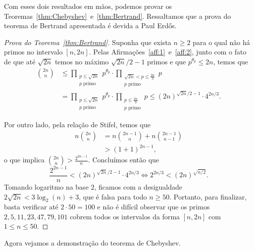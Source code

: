 \documentclass{hipatia}
\begin{document}
Com esses dois resultados em mãos, podemos provar os Teoremas~\ref{thm:Chebyshev}~e~\ref{thm:Bertrand}. Ressaltamos que a prova do teorema de Bertrand apresentada é devida a Paul Erd\H{o}s.

\begin{proof}[Prova do Teorema~\ref{thm:Bertrand}]
Suponha que exista $n \ge 2$ para o qual não há primos no intervalo $[n,2n]$. Pelas Afirmações~\ref{aff:1}~e~\ref{aff:2}, junto com o fato de que até $\sqrt{2n}$ temos no máximo $\sqrt{2n}/2 - 1$ primos e que $p^{\theta_p} \le 2n$, temos que
\begin{align*}
\binom{2n}{n} &\le \prod_{\substack{p \le \sqrt{2n}\\p\text{ primo}}} p^{\theta_p} \cdot \prod_{\substack{\sqrt{2n}<p\le\frac{2n}{3}\\p\text{ primo}}}p \\ &=\prod_{\substack{p \le \sqrt{2n}\\p\text{ primo}}} p^{\theta_p} \cdot \prod_{\substack{p\le\frac{2n}{3}\\p\text{ primo}}}p\le(2n)^{\sqrt{2n}/2-1}\cdot4^{2n/3}.
\end{align*}

Por outro lado, pela relação de Stifel, temos que
\begin{align*}
    n\binom{2n}{n}&=n\binom{2n-1}{n}+n\binom{2n-1}{n-1} \\
    &>(1+1)^{2n-1},    
\end{align*}
o que implica $\binom{2n}{n} > \frac{2^{2n-1}}{n}$. Concluímos então que
\[\frac{2^{2n-1}}{n}<(2n)^{\sqrt{2n}/2-1}\cdot4^{2n/3} \iff 2^{2n/3} < (2n)^{\sqrt{n/2}}.\]
Tomando logaritmo na base $2$, ficamos com a desigualdade $2\sqrt{2n}<3\log_2(n)+3$, que é falsa para todo $n \ge 50$. Portanto, para finalizar, basta verificar até $2\cdot50=100$ e não é difícil observar que os primos $2,5,11,23,47,79,101$ cobrem todos os intervalos da forma $[n,2n]$ com $1 \le n \le 50$.
\end{proof}

Agora vejamos a demonstração do teorema de Chebyshev.
\end{document}
